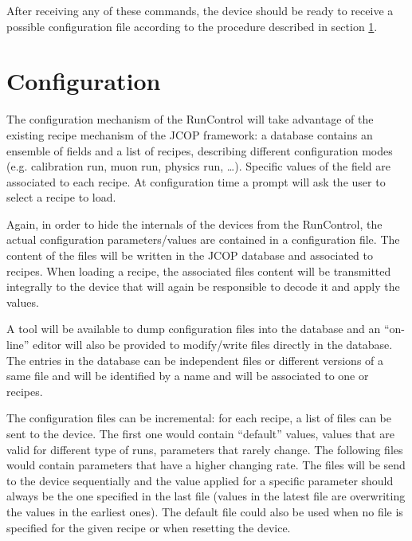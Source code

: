 \documentclass[a4paper]{article}
\begin{document}
After receiving any of these commands, the device should be ready to receive a possible
configuration file according to the procedure described in section \ref{sec:configuration}.

\section{Configuration}\label{sec:configuration}
The configuration mechanism of the RunControl will take advantage of the existing recipe mechanism
of the JCOP\cite{biblio:JCOP} framework: a database contains an ensemble of fields and a list of
recipes, describing different configuration modes (e.g. calibration run, muon
run, physics run, \ldots). Specific values of the field are associated to each
recipe. At configuration time a prompt will ask the user to select a recipe to load.

Again, in order to hide the internals of the devices from the RunControl, the actual configuration
parameters/values are contained in a configuration file. The content of the files will be written in
the JCOP database and associated to recipes. When loading a recipe, the associated files content
will be transmitted integrally to the device that will again be responsible to decode it and apply
the values.

A tool will be available to dump configuration files into the database and an ``on-line'' editor will
also be provided to modify/write files directly in the database. The entries in the database can be
independent files or different versions of a same file and will be identified by a name and will
be associated to one or recipes.

The configuration files can be incremental: for each recipe, a list of files can be sent to the
device. The first one would contain ``default'' values, values that are valid for different type of
runs, parameters that rarely change. The following files would contain parameters that have a
higher changing rate. The files will be send to the device sequentially and the value applied for a
specific parameter should always be the one specified in the last file (values in the latest file
are overwriting the values in the earliest ones). The default file could also be used when no file
is specified for the given recipe or when resetting the device.
\end{document}
